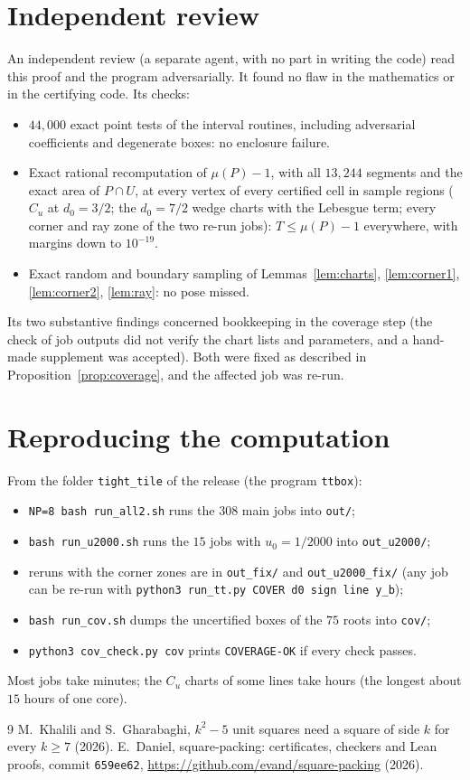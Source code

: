 \documentclass[11pt]{amsart}
\theoremstyle{definition}
\theoremstyle{remark}
\begin{document}
\section{Independent review}\label{sec:review}

An independent review (a separate agent, with no part in writing the code) read this proof and the program
adversarially. It found no flaw in the mathematics or in the certifying code. Its checks:
\begin{itemize}
\item $44{,}000$ exact point tests of the interval routines, including adversarial coefficients and degenerate boxes:
no enclosure failure.
\item Exact rational recomputation of $\mu(P)-1$, with all $13{,}244$ segments and the exact area of $P\cap U$, at every
vertex of every certified cell in sample regions ($C_u$ at $d_0=3/2$; the $d_0=7/2$ wedge charts with the Lebesgue term;
every corner and ray zone of the two re-run jobs): $T\le\mu(P)-1$ everywhere, with margins down to $10^{-19}$.
\item Exact random and boundary sampling of Lemmas~\ref{lem:charts}, \ref{lem:corner1}, \ref{lem:corner2},
\ref{lem:ray}: no pose missed.
\end{itemize}
Its two substantive findings concerned bookkeeping in the coverage step (the check of job outputs did not verify the
chart lists and parameters, and a hand-made supplement was accepted). Both were fixed as described in
Proposition~\ref{prop:coverage}, and the affected job was re-run.

\section{Reproducing the computation}\label{sec:repro}

From the folder \texttt{tight\_tile} of the release (the program \texttt{ttbox}):
\begin{itemize}
\item \texttt{NP=8 bash run\_all2.sh} runs the $308$ main jobs into \texttt{out/};
\item \texttt{bash run\_u2000.sh} runs the $15$ jobs with $u_0=1/2000$ into \texttt{out\_u2000/};
\item reruns with the corner zones are in \texttt{out\_fix/} and \texttt{out\_u2000\_fix/} (any job can be re-run with
\texttt{python3 run\_tt.py COVER d0 sign line y\_b});
\item \texttt{bash run\_cov.sh} dumps the uncertified boxes of the $75$ roots into \texttt{cov/};
\item \texttt{python3 cov\_check.py cov} prints \texttt{COVERAGE-OK} if every check passes.
\end{itemize}
Most jobs take minutes; the $C_u$ charts of some lines take hours (the longest about $15$ hours of one core).

\begin{thebibliography}{9}
 M.~Khalili and S.~Gharabaghi, $k^2-5$ unit squares need a square of side $k$ for every $k\ge7$
(2026).
 E.~Daniel, square-packing: certificates, checkers and Lean proofs, commit \texttt{659ee62},
\url{https://github.com/evand/square-packing} (2026).
\end{thebibliography}
\end{document}
